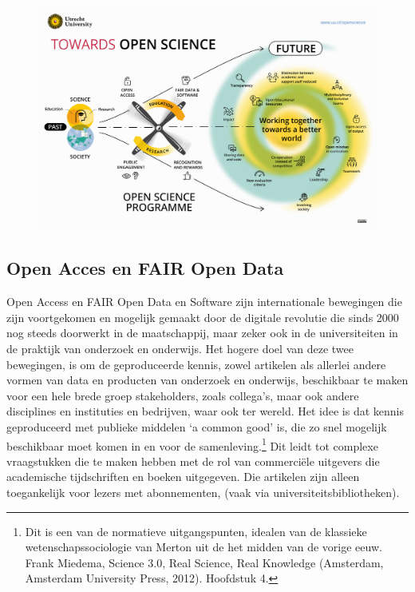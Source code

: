\documentclass[empirical, authordate, ]{new-jote-article}
\begin{document}
	\begin{figure}
		\includegraphics[width=\linewidth]{media/image1.png}

		\caption{}

		\label{fig:rId13}


	\end{figure}



	\subsection{Open Acces en FAIR Open Data}



	Open Access en FAIR Open Data en Software zijn internationale bewegingen die zijn voortgekomen en mogelijk gemaakt door de digitale revolutie die sinds 2000 nog steeds doorwerkt in de maatschappij, maar zeker ook in de universiteiten in de praktijk van onderzoek en onderwijs. Het hogere doel van deze twee bewegingen, is om de geproduceerde kennis, zowel artikelen als allerlei andere vormen van data en producten van onderzoek en onderwijs, beschikbaar te maken voor een hele brede groep stakeholders, zoals collega's, maar ook andere disciplines en instituties en bedrijven, waar ook ter wereld. Het idee is dat kennis geproduceerd met publieke middelen ‘a common good' is, die zo snel mogelijk beschikbaar moet komen in en voor de samenleving.\footnote{Dit is een van de normatieve uitgangspunten, idealen van de klassieke wetenschapssociologie van Merton uit de het midden van de vorige eeuw. Frank Miedema, Science 3.0, Real Science, Real Knowledge (Amsterdam, Amsterdam University Press, 2012). Hoofdstuk 4.} Dit leidt tot complexe vraagstukken die te maken hebben met de rol van commerciële uitgevers die academische tijdschriften en boeken uitgegeven. Die artikelen zijn alleen toegankelijk voor lezers met abonnementen, (vaak via universiteitsbibliotheken).
\end{document}
